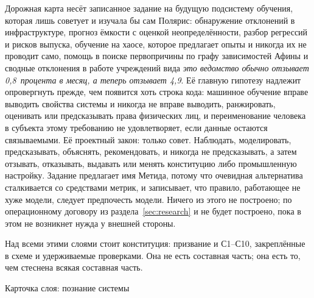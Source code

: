 Дорожная карта несёт записанное задание на будущую подсистему обучения, которая лишь советует и
изучала бы сам Полярис: обнаружение отклонений в инфраструктуре, прогноз ёмкости с оценкой
неопределённости, разбор регрессий и рисков выпуска, обучение на хаосе, которое предлагает опыты и
никогда их не проводит само, помощь в поиске первопричины по графу зависимостей Афины и сводные
отклонения в работе учреждений вида \emph{это ведомство обычно отзывает 0,8~процента в месяц, а
теперь отзывает 4,9}. Её главную гипотезу надлежит опровергнуть прежде, чем появится хоть строка
кода: машинное обучение вправе выводить свойства системы и никогда не вправе выводить, ранжировать,
оценивать или предсказывать права физических лиц, и переименование человека в субъекта этому
требованию не удовлетворяет, если данные остаются связываемыми. Её проектный закон: только совет.
Наблюдать, моделировать, предсказывать, объяснять, рекомендовать, и никогда не предсказывать, а
затем отзывать, отказывать, выдавать или менять конституцию либо промышленную настройку. Задание
предлагает имя Метида, потому что очевидная альтернатива сталкивается со средствами метрик, и
записывает, что правило, работающее не хуже модели, следует предпочесть модели. Ничего из этого не
построено; по операционному договору из раздела~\ref{sec:research} и не будет построено, пока в этом
не возникнет нужда у внешней стороны. \sFut

Над всеми этими слоями стоит конституция: призвание и С1--С10, закреплённые в схеме и удерживаемые
проверками. Она не есть составная часть; она есть то, чем стеснена всякая составная часть.

\begin{layercard}{Карточка слоя: познание системы}
\end{layercard}

